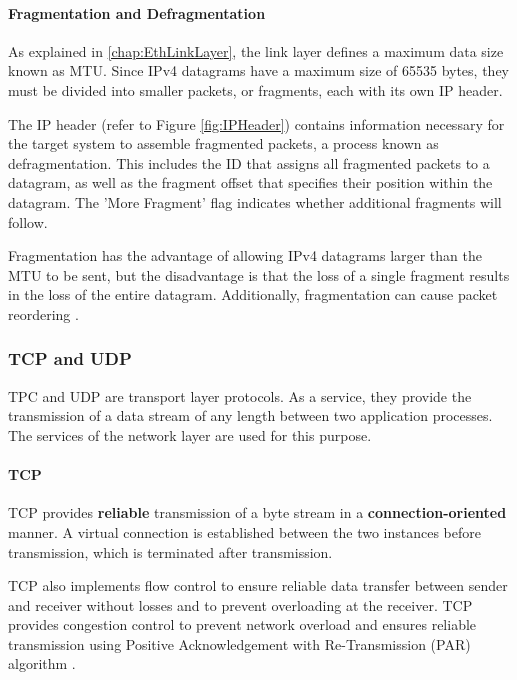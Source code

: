 \paragraph{Fragmentation and Defragmentation}

As explained in \ref{chap:EthLinkLayer}, the link layer defines a maximum data size known as MTU. Since IPv4 datagrams have a maximum size of 65535 bytes, they must be divided into smaller packets, or fragments, each with its own IP header.

The IP header (refer to Figure \ref{fig:IPHeader}) contains information necessary for the target system to assemble fragmented packets, a process known as defragmentation. This includes the ID that assigns all fragmented packets to a datagram, as well as the fragment offset that specifies their position within the datagram. The 'More Fragment' flag indicates whether additional fragments will follow.

Fragmentation has the advantage of allowing IPv4 datagrams larger than the MTU to be sent, but the disadvantage is that the loss of a single fragment results in the loss of the entire datagram. Additionally, fragmentation can cause packet reordering \cite{IPFragDetail}.

\subsubsection{TCP and UDP}
TPC and UDP are transport layer protocols. As a service, they provide the transmission of a data stream of any length between two application processes. The services of the network layer are used for this purpose.

\paragraph{TCP}

TCP provides \textbf{reliable} transmission of a byte stream in a \textbf{connection-oriented} manner. A virtual connection is established between the two instances before transmission, which is terminated after transmission.

TCP also implements flow control to ensure reliable data transfer between sender and receiver without losses and to prevent overloading at the receiver.  TCP provides congestion control to prevent network overload and ensures reliable transmission using Positive Acknowledgement with Re-Transmission (PAR) algorithm \cite{Holtkamp2024Transport}.  

